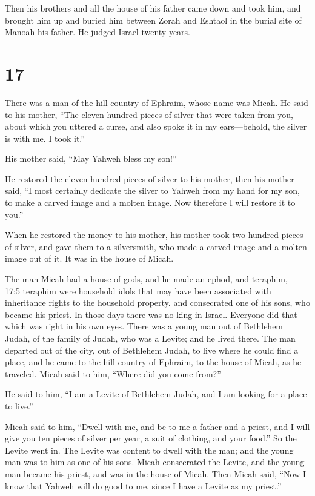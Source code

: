  Then his brothers and all the house of his father came
down and took him, and brought him up and buried him between Zorah and
Eshtaol in the burial site of Manoah his father. He judged Israel twenty
years.

\hypertarget{section-16}{%
\section{17}\label{section-16}}

 There was a man of the hill country of Ephraim, whose name
was Micah.  He said to his mother, ``The eleven hundred
pieces of silver that were taken from you, about which you uttered a
curse, and also spoke it in my ears---behold, the silver is with me. I
took it.''

His mother said, ``May Yahweh bless my son!''

 He restored the eleven hundred pieces of silver to his
mother, then his mother said, ``I most certainly dedicate the silver to
Yahweh from my hand for my son, to make a carved image and a molten
image. Now therefore I will restore it to you.''

 When he restored the money to his mother, his mother took
two hundred pieces of silver, and gave them to a silversmith, who made a
carved image and a molten image out of it. It was in the house of Micah.

 The man Micah had a house of gods, and he made an ephod,
and teraphim,+ 17:5 teraphim were household idols that may have been
associated with inheritance rights to the household property. and
consecrated one of his sons, who became his priest.  In
those days there was no king in Israel. Everyone did that which was
right in his own eyes.  There was a young man out of
Bethlehem Judah, of the family of Judah, who was a Levite; and he lived
there.  The man departed out of the city, out of Bethlehem
Judah, to live where he could find a place, and he came to the hill
country of Ephraim, to the house of Micah, as he traveled. 
Micah said to him, ``Where did you come from?''

He said to him, ``I am a Levite of Bethlehem Judah, and I am looking for
a place to live.''

 Micah said to him, ``Dwell with me, and be to me a father
and a priest, and I will give you ten pieces of silver per year, a suit
of clothing, and your food.'' So the Levite went in.  The
Levite was content to dwell with the man; and the young man was to him
as one of his sons.  Micah consecrated the Levite, and the
young man became his priest, and was in the house of Micah.
 Then Micah said, ``Now I know that Yahweh will do good to
me, since I have a Levite as my priest.''

